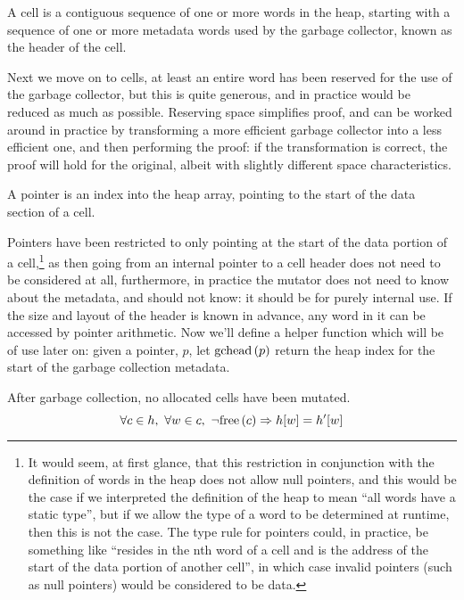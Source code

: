 \begin{definition}[Cell]
  \label{def:ms-cell}
  A cell is a contiguous sequence of one or more words in the heap,
  starting with a sequence of one or more metadata words used by the
  garbage collector, known as the header of the cell.
\end{definition}

Next we move on to cells, at least an entire word has been reserved
for the use of the garbage collector, but this is quite generous, and
in practice would be reduced as much as possible. Reserving space
simplifies proof, and can be worked around in practice by transforming
a more efficient garbage collector into a less efficient one, and then
performing the proof: if the transformation is correct, the proof will
hold for the original, albeit with slightly different space
characteristics.

\begin{definition}[Pointer]
  \label{def:ms-pointer}
  A pointer is an index into the heap array, pointing to the start of
  the data section of a cell.
\end{definition}

Pointers have been restricted to only pointing at the start of the
data portion of a cell,\footnote{It would seem, at first glance, that
  this restriction in conjunction with the definition of words in the
  heap does not allow null pointers, and this would be the case if we
  interpreted the definition of the heap to mean ``all words have a
  static type'', but if we allow the type of a word to be determined
  at runtime, then this is not the case. The type rule for pointers
  could, in practice, be something like ``resides in the nth word of a
  cell and is the address of the start of the data portion of another
  cell'', in which case invalid pointers (such as null pointers) would
  be considered to be data.} as then going from an internal pointer to
a cell header does not need to be considered at all, furthermore, in
practice the mutator does not need to know about the metadata, and
should not know: it should be for purely internal use. If the size and
layout of the header is known in advance, any word in it can be
accessed by pointer arithmetic. Now we'll define a helper function
which will be of use later on: given a pointer, $p$, let $\mathrm{gchead}\left(p\right)$
return the heap index for the start of the garbage collection
metadata.

\begin{definition}
  \label{def:ms-word-preservation}
  After garbage collection, no allocated cells have been mutated.
   \[\forall c \in h,\ \forall w \in c,\ \lnot\mathrm{free}\left(c\right) \Rightarrow h[w] =
   h'[w]\]
\end{definition}

